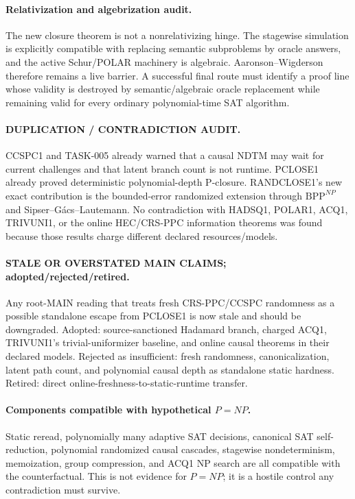 \documentclass[11pt]{article}
\begin{document}
\paragraph{Relativization and algebrization audit.}
The new closure theorem is not a nonrelativizing hinge. The stagewise simulation is explicitly
compatible with replacing semantic subproblems by oracle answers, and the active Schur/POLAR
machinery is algebraic. Aaronson--Wigderson therefore remains a live barrier. A successful final route
must identify a proof line whose validity is destroyed by semantic/algebraic oracle replacement while
remaining valid for every ordinary polynomial-time SAT algorithm.

\paragraph{DUPLICATION / CONTRADICTION AUDIT.}
CCSPC1 and TASK-005 already warned that a causal NDTM may wait for current challenges and that latent
branch count is not runtime. PCLOSE1 already proved deterministic polynomial-depth P-closure.
RANDCLOSE1's new exact contribution is the bounded-error randomized extension through
\(\mathrm{BPP}^{NP}\) and Sipser--G\'acs--Lautemann. No contradiction with HADSQ1, POLAR1, ACQ1,
TRIVUNI1, or the online HEC/CRS-PPC information theorems was found because those results charge
different declared resources/models.

\paragraph{STALE OR OVERSTATED MAIN CLAIMS; adopted/rejected/retired.}
Any root-MAIN reading that treats fresh CRS-PPC/CCSPC randomness as a possible standalone escape from
PCLOSE1 is now stale and should be downgraded. Adopted: source-sanctioned Hadamard branch, charged
ACQ1, TRIVUNI1's trivial-uniformizer baseline, and online causal theorems in their declared models.
Rejected as insufficient: fresh randomness, canonicalization, latent path count, and polynomial causal
depth as standalone static hardness. Retired: direct online-freshness-to-static-runtime transfer.

\paragraph{Components compatible with hypothetical \(P=NP\).}
Static reread, polynomially many adaptive SAT decisions, canonical SAT self-reduction, polynomial
randomized causal cascades, stagewise nondeterminism, memoization, group compression, and ACQ1 NP
search are all compatible with the counterfactual. This is not evidence for \(P=NP\); it is a hostile
control any contradiction must survive.
\end{document}
